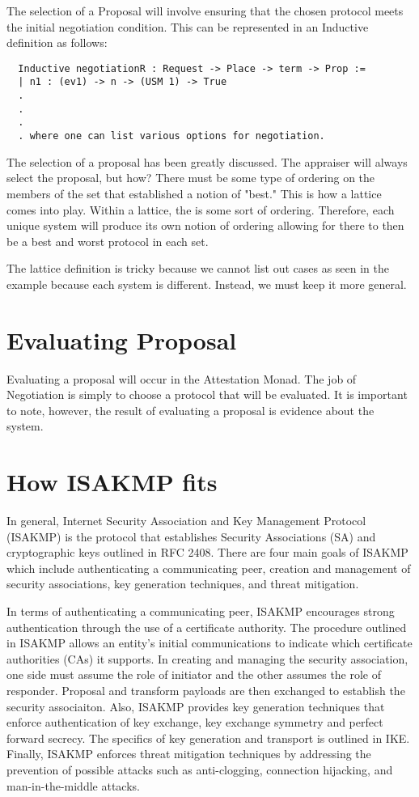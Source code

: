 \documentclass[10pt]{report}
\begin{document}
  The selection of a Proposal will involve ensuring that the chosen
  protocol meets the initial negotiation condition. This can be
  represented in an Inductive definition as follows:
  
  \begin{verbatim}
  Inductive negotiationR : Request -> Place -> term -> Prop :=
  | n1 : (ev1) -> n -> (USM 1) -> True
  .
  .
  .
  . where one can list various options for negotiation. 
  \end{verbatim} 
  
  The selection of a proposal has been greatly discussed. The
  appraiser will always select the proposal, but how? There must be some
  type of ordering on the members of the set that established a notion of
  "best." This is how a lattice comes into play. Within a lattice, the is
  some sort of ordering. Therefore, each unique system will produce its own
  notion of ordering allowing for there to then be a best and worst protocol
  in each set. 
	
  The lattice definition is tricky because we cannot list out cases as
  seen in the example because each system is different. Instead, we must
  keep it more general. 

\section {Evaluating Proposal}

Evaluating a proposal will occur in the Attestation Monad. The job of
Negotiation is simply to choose a protocol that will be evaluated. It is
important to note, however, the result of evaluating a proposal is evidence
about the system.  

\section {How ISAKMP fits} 

In general, Internet Security Association and Key Management Protocol
(ISAKMP) is the protocol that establishes Security Associations
(SA) and cryptographic keys outlined in RFC 2408. There are
four main goals of ISAKMP which include authenticating a communicating
peer, creation and management of security associations, key generation techniques,
and threat mitigation.

In terms of authenticating a communicating peer, ISAKMP encourages
strong authentication through the use of a certificate authority. The procedure
outlined in ISAKMP allows an entity's initial
communications to indicate which certificate authorities (CAs) it supports.
In creating and managing the security association, one side must assume the role
of initiator and the other assumes the role of responder. Proposal and
transform payloads are then exchanged to establish the security associaiton.
Also, ISAKMP provides key generation techniques that enforce  authentication
of key exchange, key exchange symmetry and perfect forward secrecy. The specifics
of key generation and transport is outlined in IKE. Finally, ISAKMP enforces
threat mitigation techniques by addressing the prevention of possible attacks
such as anti-clogging, connection hijacking, and man-in-the-middle attacks.
\end{document}
